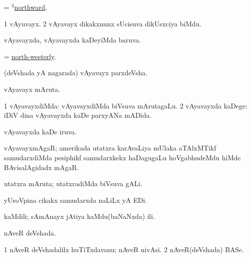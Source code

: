 \bentry
{}
\gl{\kirxvi}
\bmng
= \hyperlink{northward(3)}{$^3$northward}. 
\emng
\eentry

\bentry
{}
\gl{\nA}
\bmng
\bnum
\num{1} vAyuvayx. 
\num{2} vAyavayx dikakxnunx sUcisuva dikUsxciya biMdu. 
\enum
\emng
\eentry

\bentry
{}
\gl{\gu}
\bmng
vAyavayxda, vAyavayxda kaDeyiMda baruva. 
\emng
\eentry

\bentry
{}
\gl{\kirxvi}
\bmng
= \hyperlink{north-westerly}{north-westerly}. 
\emng
\eentry

\bentry
{}
\gl{\nA}
\bmng
(deVshada yA nagarada) vAyavayx parxdeVsha. 
\emng
\eentry

\bentry
{}
\gl{\nA}
\bmng
vAyavayx mAruta. 
\emng
\eentry

\bentry
{}
\gl{\kirxvi}
\bmng
\bnum
\num{1} vAyavayxdiMda:  vAyavayxdiMda biVsuva mArutagaLu. 
\num{2} vAyavayxda kaDege:  iDiV dina vAyavayxda kaDe parxyANa mADida. 
\enum
\emng
\eentry

\bentry
{}
\gl{\gu}
\bmng
vAyavayxda kaDe iruva. 
\emng
\eentry

\bentry
{}
\gl{\nA}
\bmng
vAyavayxmAgaR; amerikada utatxra karAvaLiya mUlaka aTAlxMTikf samudarxdiMda pesiphikf samudarxkekx haDagugaLu hoVgabhudeMdu hiMde BAvisalAgidadx mAgaR. 
\emng
\eentry

\bentry
{}
\gl{\nA}
\bmng
utatxra mAruta; utatxradiMda biVsuva gALi. 
\emng
\eentry

\bentry
{}
\gl{\nA}
\bmng
yUroVpina cikakx samudarxda naLiLx yA EDi. 
\emng
\eentry

\bentry
{}
\gl{\nA}
\bmng
kaMdili; sAmAnayx jAtiya kaMdu(baNaNxda) ili. 
\emng
\eentry

\bentry
{}
\gl{\gu}
\bmng
nAveR deVshada. 
\emng
\eentry

\bentry
{}
\gl{\nA}
\bmng
\bnum
\num{1} nAveR deVshadalilx huTiTxdavanu; nAveR nivAsi. 
\num{2} nAveR(deVshada) BASe. 
\enum
\emng
\eentry

